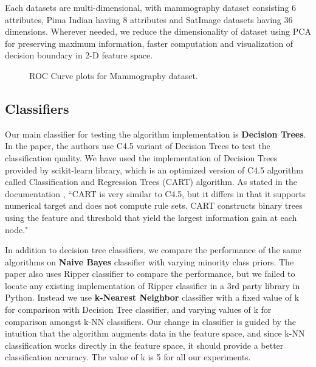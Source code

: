 \documentclass[10pt,journal,compsoc]{IEEEtran}
\begin{document}
Each datasets are multi-dimensional, with mammography dataset consisting 6 attributes, Pima Indian having 8 attributes and SatImage datasets having 36 dimensions.
Wherever needed, we reduce the dimensionality of dataset using PCA for preserving maximum information, faster computation and visualization of decision boundary in 2-D feature space.
\begin{figure}[!b]
\centering
{}
\hfil
{}
\hfil
\caption{ROC Curve plots for Mammography dataset.}
\label{fig:mammo}
\end{figure}

\subsection{Classifiers}
Our main classifier for testing the algorithm implementation is \textbf{Decision Trees}.
In the paper, the authors use C4.5 variant of Decision Trees to test the classification quality.
We have used the implementation of Decision Trees provided by scikit-learn library, which is an optimized version of C4.5 algorithm called Classification and Regression Trees (CART) algorithm.
As stated in the documentation \cite{dtree}, ``CART is very similar to C4.5, but it differs in that it supports numerical target and does not compute rule sets. 
CART constructs binary trees using the feature and threshold that yield the largest information gain at each node."

In addition to decision tree classifiers, we compare the performance of the same algorithms on \textbf{Naive Bayes} classifier with varying minority class priors.
The paper also uses Ripper classifier to compare the performance, but we failed to locate any existing implementation of Ripper classifier in a 3rd party library in Python.
Instead we use \textbf{k-Nearest Neighbor} classifier with a fixed value of k for comparison with Decision Tree classifier, and varying values of k for comparison amongst k-NN classifiers.
Our change in classifier is guided by the intuition that the algorithm augments data in the feature space, and since k-NN classification works directly in the feature space, it should provide a better classification accuracy.
The value of k is 5 for all our experiments.
\end{document}
